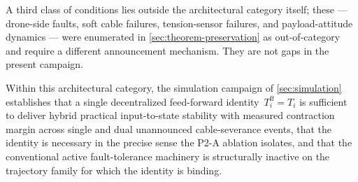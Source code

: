 A third class of conditions lies outside the architectural category itself; these --- drone-side faults, soft cable failures, tension-sensor failures, and payload-attitude dynamics --- were enumerated in \cref{sec:theorem-preservation} as out-of-category and require a different announcement mechanism. They are not gaps in the present campaign.

Within this architectural category, the simulation campaign of \cref{sec:simulation} establishes that a single decentralized feed-forward identity~$T_i^{\mathrm{ff}}=T_i$ is sufficient to deliver hybrid practical input-to-state stability with measured contraction margin across single and dual unannounced cable-severance events, that the identity is necessary in the precise sense the P2-A ablation isolates, and that the conventional active fault-tolerance machinery is structurally inactive on the trajectory family for which the identity is binding.
